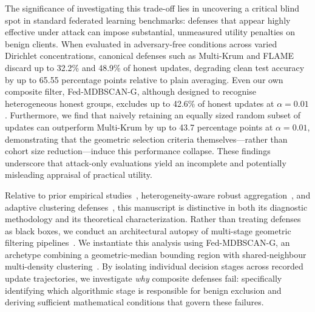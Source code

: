 \documentclass[journal]{IEEEtran}
\newcommand{\method}{Fed-MDBSCAN-G}
\begin{document}
The significance of investigating this trade-off lies in uncovering a critical blind spot in standard federated learning benchmarks: defenses that appear highly effective under attack can impose substantial, unmeasured utility penalties on benign clients. When evaluated in adversary-free conditions across varied Dirichlet concentrations, canonical defenses such as Multi-Krum and FLAME discard up to 32.2\% and 48.9\% of honest updates, degrading clean test accuracy by up to 65.55 percentage points relative to plain averaging. Even our own composite filter, \method{}, although designed to recognise heterogeneous honest groups, excludes up to 42.6\% of honest updates at $\alpha=0.01$. Furthermore, we find that naively retaining an equally sized random subset of updates can outperform Multi-Krum by up to 43.7 percentage points at $\alpha=0.01$, demonstrating that the geometric selection criteria themselves---rather than cohort size reduction---induce this performance collapse. These findings underscore that attack-only evaluations yield an incomplete and potentially misleading appraisal of practical utility.

Relative to prior empirical studies~\cite{li2024experimental}, heterogeneity-aware robust aggregation~\cite{liu2023byzantine}, and adaptive clustering defenses~\cite{wang2023adaptive}, this manuscript is distinctive in both its diagnostic methodology and its theoretical characterization. Rather than treating defenses as black boxes, we conduct an architectural autopsy of multi-stage geometric filtering pipelines~\cite{mia2025bart}. We instantiate this analysis using \method{}, an archetype combining a geometric-median bounding region with shared-neighbour multi-density clustering~\cite{qian2024mdbscan}. By isolating individual decision stages across recorded update trajectories, we investigate \emph{why} composite defenses fail: specifically identifying which algorithmic stage is responsible for benign exclusion and deriving sufficient mathematical conditions that govern these failures.
\end{document}
